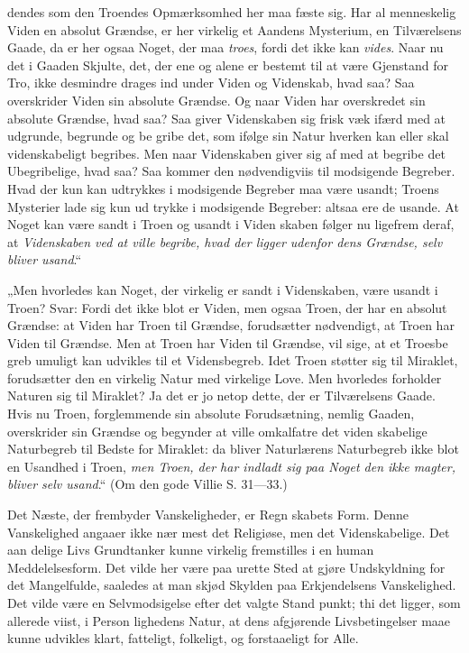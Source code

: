 \documentclass[12pt]{book}
\newcommand{\opage}[1]{\marginnote{\footnotesize\textit{[#1]}}}
\begin{document}
dendes som den Troendes Opmærksomhed her maa
fæste sig. Har al menneskelig Viden en absolut
Grændse, er her virkelig et Aandens Mysterium, en
Tilværelsens Gaade, da er her ogsaa Noget, der maa
\emph{troes}, fordi det ikke kan \emph{vides}. Naar nu det i Gaaden
Skjulte, det, der ene og alene er bestemt til at være
Gjenstand for Tro, ikke desmindre drages ind under
Viden og Videnskab, hvad saa? Saa overskrider Viden
sin absolute Grændse. Og naar Viden har overskredet sin
absolute Grændse, hvad saa? Saa giver Videnskaben
sig frisk væk ifærd med at udgrunde, begrunde og be\-%
gribe det, som ifølge sin Natur hverken kan eller skal
videnskabeligt begribes. Men naar Videnskaben giver sig
af med at begribe det Ubegribelige, hvad saa? Saa
kommer den nødvendigviis til modsigende Begreber.
Hvad der kun kan udtrykkes i modsigende Begreber
maa være usandt; Troens Mysterier lade sig kun ud\-%
trykke i modsigende Begreber: altsaa ere de usande.
At Noget kan være sandt i Troen og usandt i Viden\-%
skaben følger nu ligefrem deraf, at \emph{Videnskaben ved
at ville begribe, hvad der ligger udenfor dens
Grændse, selv bliver usand}.“

„Men hvorledes kan Noget, der virkelig er sandt i
Videnskaben, være usandt i Troen? Svar: Fordi det
ikke blot er Viden, men ogsaa Troen, der har en absolut
Grændse: at Viden har Troen til Grændse, forudsætter
nødvendigt, at Troen har Viden til Grændse. Men at
Troen har Viden til Grændse, vil sige, at et Troesbe\-%
greb umuligt kan udvikles til et Vidensbegreb. Idet
Troen støtter sig til Miraklet, forudsætter den en virkelig
Natur med virkelige Love. Men hvorledes forholder
Naturen sig til Miraklet? Ja det er jo netop dette, der
\opage{228}\setcounter{footnote}{0}%
er Tilværelsens Gaade. Hvis nu Troen, forglemmende
sin absolute Forudsætning, nemlig Gaaden, overskrider
sin Grændse og begynder at ville omkalfatre det viden\-%
skabelige Naturbegreb til Bedste for Miraklet: da bliver
Naturlærens Naturbegreb ikke blot en Usandhed i Troen,
\emph{men Troen, der har indladt sig paa Noget den
ikke magter, bliver selv usand}.“ (Om den gode
Villie S. 31---33.)

Det Næste, der frembyder Vanskeligheder, er Regn\-%
skabets Form. Denne Vanskelighed angaaer ikke nær\-%
mest det Religiøse, men det Videnskabelige. Det aan\-%
delige Livs Grundtanker kunne virkelig fremstilles i en
human Meddelelsesform. Det vilde her være paa urette
Sted at gjøre Undskyldning for det Mangelfulde, saaledes
at man skjød Skylden paa Erkjendelsens Vanskelighed.
Det vilde være en Selvmodsigelse efter det valgte Stand\-%
punkt; thi det ligger, som allerede viist, i Person\-%
lighedens Natur, at dens afgjørende Livsbetingelser maae
kunne udvikles klart, fatteligt, folkeligt, og forstaaeligt
for Alle.
\end{document}
